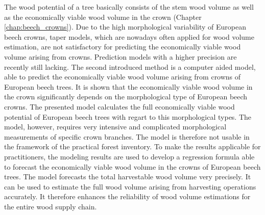 The wood potential of a tree basically consists of the stem wood volume as well as the economically viable wood volume in the crown (Chapter \ref{chap:beech_crowns}). Due to the high morphological variability of European beech crowns, taper models, which are nowadays often applied for wood volume estimation, are not satisfactory for predicting the economically viable wood volume arising from crowns. Prediction models with a higher precision are recently still lacking. The second introduced method is a computer aided model, able to predict the economically viable wood volume arising from crowns of European beech trees. It is shown that the economically viable wood volume in the crown significantly depends on the morphological type of European beech crowns. The presented model calculates the full economically viable wood potential of European beech trees with regart to this morphological types. The model, however, requires very intensive and complicated morphological measurements of specific crown branches. The model is therefore not usable in the framework of the practical forest inventory. To make the results applicable for practitioners, the modeling results are used to develop a regression formula able to forecast the economically viable wood volume in the crowns of European beech trees. The model forecasts the total harvestable wood volume very precisely. It can be used to estimate the full wood volume arising from harvesting operations accurately. It therefore enhances the reliability of wood volume estimations for the entire wood supply chain.

